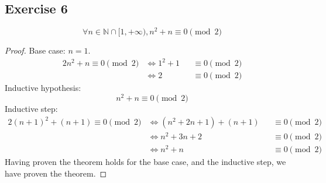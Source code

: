 \subsection{Exercise 6}
\begin{theorem}
	\begin{equation*}
		\forall n \in \mathbb{N}\cap[1,+\infty),n^2+n \equiv 0 \pmod{2}
	\end{equation*}
\end{theorem}
\begin{proof}
	Base case: $n=1$.
	\begin{alignat*}{2}
		n^2+n \equiv 0 \pmod{2}
		&\iff 1^2+1 &&\equiv 0 \pmod{2} \\
		&\iff 2     &&\equiv 0 \pmod{2}
	\end{alignat*}
	Inductive hypothesis:
	\begin{equation*}
		n^2+n \equiv 0 \pmod{2}
	\end{equation*}
	Inductive step:
	\begin{alignat*}{2}
			(n+1)^2+(n+1) \equiv 0 \pmod{2}
			&\iff (n^2+2n+1)+(n+1) &&\equiv 0 \pmod{2} \\
			&\iff n^2+3n+2         &&\equiv 0 \pmod{2} \\
			&\iff n^2+n            &&\equiv 0 \pmod{2}
	\end{alignat*}
	Having proven the theorem holds for the base case, and the inductive step, we have proven the theorem.
\end{proof}
